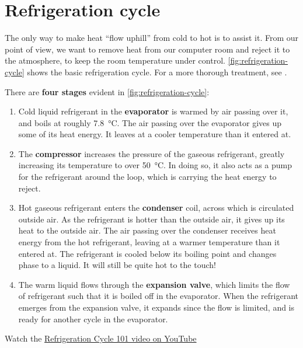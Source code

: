\documentclass{pgnotes}
\begin{document}
\section{Refrigeration cycle}

The only way to make heat ``flow uphill'' from cold to hot is to assist it.
From our point of view, we want to remove heat from our computer room and reject it to the atmosphere, to keep the room temperature under control.
\autoref{fig:refrigeration-cycle} shows the basic refrigeration cycle.
For a more thorough treatment, see \citet{evans:2014:fundamental}.


There are \textbf{four stages} evident in \autoref{fig:refrigeration-cycle}:
\begin{enumerate}
\item Cold liquid refrigerant in the \textbf{evaporator} is warmed by air passing over it, and boils at roughly \SI{7.8}{\degreeCelsius}. The air passing over the evaporator gives up some of its heat energy. It leaves at a cooler temperature than it entered at.
\item The \textbf{compressor} increases the pressure of the gaseous refrigerant, greatly increasing its temperature to over \SI{50}{\degreeCelsius}.  In doing so, it also acts as a pump for the refrigerant around the loop, which is carrying the heat energy to reject.
\item Hot gaseous refrigerant enters the \textbf{condenser} coil, across which is circulated outside air. As the refrigerant is hotter than the outside air, it gives up its heat to the outside air.  The air passing over the condenser receives heat energy from the hot refrigerant, leaving at a warmer temperature than it entered at. The refrigerant is cooled below its boiling point and changes phase to a liquid.  It will still be quite hot to the touch!
\item The warm liquid flows through the \textbf{expansion valve}, which limits the flow of refrigerant such that it is boiled off in the evaporator. When the refrigerant emerges from the expansion valve, it expands since the flow is limited, and is ready for another cycle in the evaporator. 
\end{enumerate}

Watch the \href{https://www.youtube.com/watch?v=VJX0LyxRV0E}{Refrigeration Cycle 101 video on YouTube}

\newpage
\end{document}
